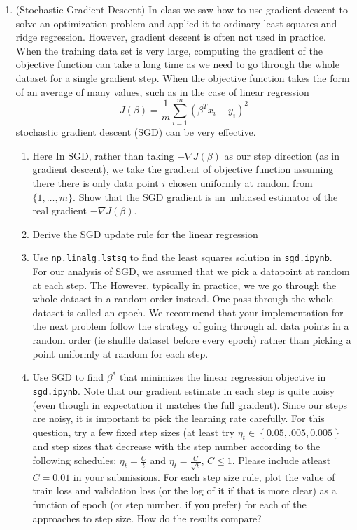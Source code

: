 \documentclass[12pt,twoside]{article}
\begin{document}
\begin{enumerate}
 \item (Stochastic Gradient Descent) In class we saw how to use gradient descent to solve an optimization problem and applied it to ordinary least squares and ridge regression.  However, gradient descent is often not used in practice.  When the training data set is very large,  computing the gradient of the objective function can take a long time as we need to go through the whole dataset for a single gradient step.  When the objective function takes the form of an average of
many values, such as in the case of linear regression
\[
J(\beta)= \frac{1}{m}\sum_{i=1}^{m}\left( \beta^Tx_{i} -y_{i}\right)^{2}
\]
 stochastic gradient descent (SGD) can be very effective.  
 \begin{enumerate}

\item Here In SGD, rather than taking $-\nabla J(\beta)$
as our step direction (as in gradient descent),  we take the gradient of objective function assuming there there is only data point $i$ chosen uniformly at random from $\{1,\ldots,m\}$.  Show that the SGD gradient is an unbiased estimator of the real gradient  $-\nabla J(\beta)$. 

\item Derive the SGD update rule for the linear regression  

\item Use \texttt{np.linalg.lstsq} to find the least squares solution in \texttt{sgd.ipynb}. \\

 \noindent For our analysis of SGD, we assumed that we pick a datapoint at random at each step.  The However, typically in practice,  we we go through the whole dataset in a random order instead.  One pass through the whole dataset is called an epoch.  We recommend that your implementation for the next problem follow the strategy of going through all data points in a random order (ie shuffle dataset before every epoch) rather than picking a point uniformly at random for each step.  

\item  Use SGD to find $\beta^{*}$ that minimizes the linear regression 
objective  in \texttt{sgd.ipynb}.  Note that our gradient estimate in each step is quite noisy (even though in expectation it matches the full graident).  Since our steps are noisy,  it is important to pick the learning rate carefully.  For this question,  try a few fixed step sizes (at least try $\eta_{t}\in\left\{ 0.05,.005, 0.005\right\} $ and step sizes that decrease with the step number according
to the following schedules: $\eta_{t}=\frac{C}{t}$ and $\eta_{t}=\frac{C}{\sqrt{t}}$, $C \leq 1$.  Please include atleast $C = 0.01$ in your submissions.  For each step size rule,  plot the value of train loss and validation loss
(or the log of it if that is more clear) as a
function of epoch (or step number, if you prefer) for each of the
approaches to step size.  How do the results compare?


\end{enumerate}
\end{enumerate}
\end{document}
